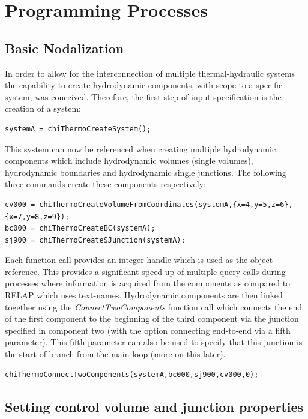 \documentclass[11pt,letterpaper,titlepage]{article}
\begin{document}
\newpage
{}
\section{Programming Processes}
\subsection{Basic Nodalization}
In order to allow for the interconnection of multiple thermal-hydraulic systems the capability to create hydrodynamic components, with scope to a specific system, was conceived. Therefore, the first step of input specification is the creation of a system:

\begin{lstlisting}
systemA = chiThermoCreateSystem();
\end{lstlisting}
\noindent
This system can now be referenced when creating multiple hydrodynamic components which include hydrodynamic volumes (single volumes), hydrodynamic boundaries and hydrodynamic single junctions. The following three commands create these components respectively:

\begin{lstlisting}
cv000 = chiThermoCreateVolumeFromCoordinates(systemA,{x=4,y=5,z=6},{x=7,y=8,z=9});
bc000 = chiThermoCreateBC(systemA);
sj900 = chiThermoCreateSJunction(systemA);
\end{lstlisting}
\noindent
Each function call provides an integer handle which is used as the object reference. This provides a significant speed up of multiple query calls during processes where information is acquired from the components as compared to RELAP which uses text-names. Hydrodynamic components are then linked together using the 
\textit{ConnectTwoComponents} function call which connects the end of the first component to the beginning of the third component via the junction specified in component two (with the option connecting end-to-end via a fifth parameter). This fifth parameter can also be used to specify that this junction is the start of branch from the main loop (more on this later).

\begin{lstlisting}
chiThermoConnectTwoComponents(systemA,bc000,sj900,cv000,0);
\end{lstlisting}
\vspace{0.25cm}

\subsection{Setting control volume and junction properties}
\end{document}
